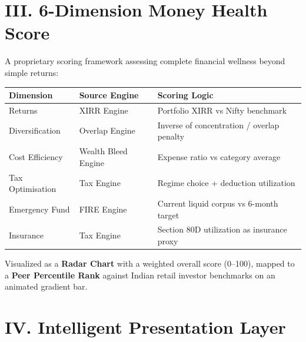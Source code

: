 \documentclass[9pt,a4paper]{article}
\begin{document}
\newpage

\section{III. 6-Dimension Money Health Score}

\small A proprietary scoring framework assessing complete financial wellness beyond simple returns:

\begin{table}[H]
\centering
\small
\setlength{\tabcolsep}{4pt}
\begin{tabularx}{0.95\textwidth}{lll}
\toprule
\textbf{Dimension} & \textbf{Source Engine} & \textbf{Scoring Logic} \\
\midrule
Returns & XIRR Engine & Portfolio XIRR vs Nifty benchmark \\
Diversification & Overlap Engine & Inverse of concentration / overlap penalty \\
Cost Efficiency & Wealth Bleed Engine & Expense ratio vs category average \\
Tax Optimisation & Tax Engine & Regime choice + deduction utilization \\
Emergency Fund & FIRE Engine & Current liquid corpus vs 6-month target \\
Insurance & Tax Engine & Section 80D utilization as insurance proxy \\
\bottomrule
\end{tabularx}
\end{table}
\vspace{-0.5em}

\small Visualized as a \textbf{Radar Chart} with a weighted overall score (0--100), mapped to a \textbf{Peer Percentile Rank} against Indian retail investor benchmarks on an animated gradient bar.

\section{IV. Intelligent Presentation Layer}
\end{document}

